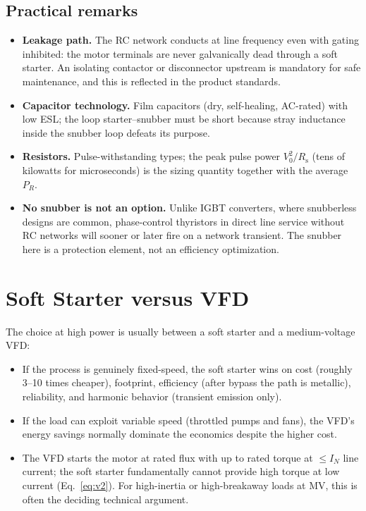 \documentclass[11pt,a4paper]{article}
\begin{document}
\subsection{Practical remarks}

\begin{itemize}
  \item \textbf{Leakage path.} The RC network conducts at line frequency even
        with gating inhibited: the motor terminals are never galvanically
        dead through a soft starter. An isolating contactor or disconnector
        upstream is mandatory for safe maintenance, and this is reflected in
        the product standards.
  \item \textbf{Capacitor technology.} Film capacitors (dry, self-healing,
        AC-rated) with low ESL; the loop starter--snubber must be short
        because stray inductance inside the snubber loop defeats its
        purpose.
  \item \textbf{Resistors.} Pulse-withstanding types; the peak pulse power
        $V_0^2/R_\mathrm{s}$ (tens of kilowatts for microseconds) is the
        sizing quantity together with the average $P_R$.
  \item \textbf{No snubber is not an option.} Unlike IGBT converters, where
        snubberless designs are common, phase-control thyristors in direct
        line service without RC networks will sooner or later fire on a
        network transient. The snubber here is a protection element, not an
        efficiency optimization.
\end{itemize}

\section{Soft Starter versus VFD}

The choice at high power is usually between a soft starter and a
medium-voltage VFD:

\begin{itemize}
  \item If the process is genuinely fixed-speed, the soft starter wins on
        cost (roughly 3--10 times cheaper), footprint, efficiency (after
        bypass the path is metallic), reliability, and harmonic behavior
        (transient emission only).
  \item If the load can exploit variable speed (throttled pumps and fans),
        the VFD's energy savings normally dominate the economics despite the
        higher cost.
  \item The VFD starts the motor at rated flux with up to rated torque at
        $\leq I_N$ line current; the soft starter fundamentally cannot
        provide high torque at low current
        (Eq.~\eqref{eq:v2}). For high-inertia or high-breakaway loads at MV,
        this is often the deciding technical argument.
\end{itemize}
\end{document}
